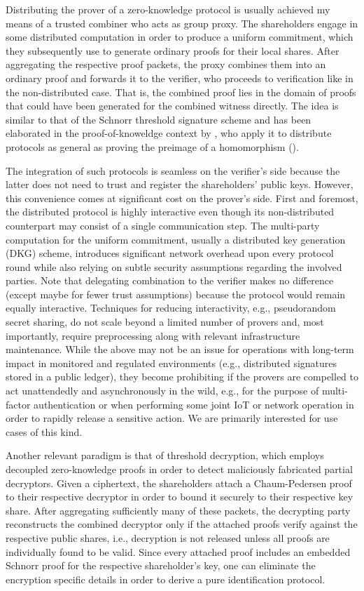 \documentclass{iacrtrans}
\begin{document}
Distributing the prover of a zero-knowledge protocol
is usually achieved my means of a trusted combiner
who acts as group proxy.
The shareholders engage in some distributed computation
in order to produce a uniform commitment,
which they subsequently use to generate
ordinary proofs for their local shares.
After aggregating
the respective proof packets,
the proxy combines them into an ordinary proof
and forwards it to the verifier,
who proceeds to verification like in the non-distributed case.
That is, the combined proof lies in the domain of proofs
that could have been generated for the combined witness directly.
The idea is similar to that of the
Schnorr threshold signature scheme
\cite{paper_stinson_strobl}
and has been elaborated
in the proof-of-knoweldge context by \cite{paper_threshold_zk},
who apply it to distribute protocols as general as
proving the preimage of a homomorphism (\cite{paper_homomorphism}).

The integration of such protocols
is seamless on the verifier's side
because the latter does not need
to trust and register the shareholders' public keys.
However, this convenience comes at significant cost on the prover's side.
First and foremost, the distributed protocol
is highly interactive even though its non-distributed
counterpart may consist of a single communication step.
The multi-party computation
for the uniform commitment,
usually a distributed key generation (DKG) scheme,
introduces significant network overhead upon every protocol round
while also relying on subtle
security assumptions regarding the involved parties.
Note that delegating combination
to the verifier makes no difference
(except maybe for fewer trust assumptions)
because the protocol would remain equally interactive.
Techniques for reducing interactivity,
e.g., pseudorandom secret sharing, do not scale beyond
a limited number of provers and,
most importantly, require preprocessing
along with relevant infrastructure maintenance.
While the above may not be an issue
for operations with long-term impact
in monitored and regulated environments
(e.g., distributed signatures stored in a public ledger),
they become prohibiting if the provers
are compelled to act unattendedly and asynchronously
in the wild,
e.g., for the purpose of multi-factor authentication
or when performing some joint IoT or network operation
in order to rapidly release a sensitive action.
We are primarily interested for use cases of this kind.

Another relevant paradigm is that of threshold decryption,
which employs decoupled zero-knowledge proofs
in order to detect maliciously fabricated partial decryptors.
Given a ciphertext, the shareholders attach
a Chaum-Pedersen proof to their respective decryptor
in order to bound it securely to their respective key share.
After aggregating sufficiently many of these packets,
the decrypting party reconstructs the combined decryptor
only if the attached proofs verify against the respective
public shares, i.e., decryption is not released
unless all proofs are individually found to be valid.
Since every attached proof
includes an  embedded Schnorr proof for the respective shareholder's key,
one can eliminate the encryption specific details
in order to derive a pure identification protocol.
\end{document}
